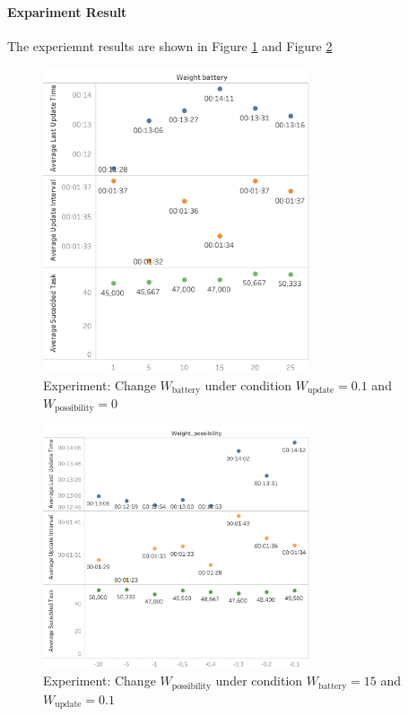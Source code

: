 \paragraph{Expariment Result} The experiemnt results are shown in Figure \ref{fig:enviroment_experiment_two_value} and Figure \ref{fig:enviroment_experiment_three_value}
\begin{figure}[htbp]
    \centering
    \includegraphics[width = 0.7\textwidth]{content/images/ch5/enviroment_change_weight_battery_only.png}
    \caption{Experiment: Change $W_{\mbox{battery}}$ under condition $W_{\mbox{update}} = 0.1$ and $W_{\mbox{possibility}}=0$}
    \label{fig:enviroment_experiment_two_value}
\end{figure}


\begin{figure}[htbp]
    \centering
    \includegraphics[width = 0.7\textwidth]{content/images/ch5/enviroment_change_weight_possibility_only.png}
    \caption{Experiment: Change $W_{\mbox{possibility}}$ under condition $W_{\mbox{battery}}=15$ and $ W_{\mbox{update}}=0.1$}
    \label{fig:enviroment_experiment_three_value}
\end{figure}

